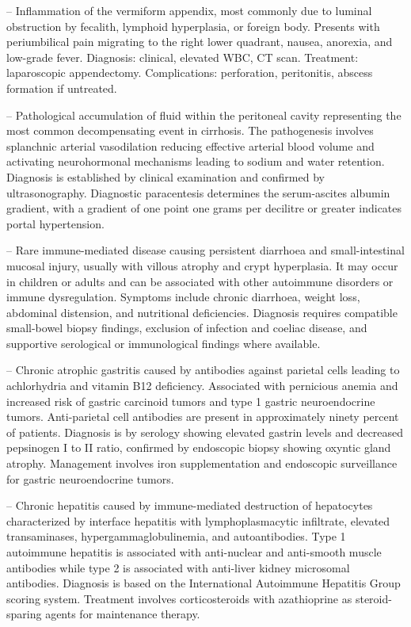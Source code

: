 -- Inflammation of the vermiform appendix, most commonly due to luminal obstruction by fecalith, lymphoid hyperplasia, or foreign body. Presents with periumbilical pain migrating to the right lower quadrant, nausea, anorexia, and low-grade fever. Diagnosis: clinical, elevated WBC, CT scan. Treatment: laparoscopic appendectomy. Complications: perforation, peritonitis, abscess formation if untreated.

-- Pathological accumulation of fluid within the peritoneal cavity representing the most common decompensating event in cirrhosis. The pathogenesis involves splanchnic arterial vasodilation reducing effective arterial blood volume and activating neurohormonal mechanisms leading to sodium and water retention. Diagnosis is established by clinical examination and confirmed by ultrasonography. Diagnostic paracentesis determines the serum-ascites albumin gradient, with a gradient of one point one grams per decilitre or greater indicates portal hypertension.

-- Rare immune-mediated disease causing persistent diarrhoea and small-intestinal mucosal injury, usually with villous atrophy and crypt hyperplasia. It may occur in children or adults and can be associated with other autoimmune disorders or immune dysregulation. Symptoms include chronic diarrhoea, weight loss, abdominal distension, and nutritional deficiencies. Diagnosis requires compatible small-bowel biopsy findings, exclusion of infection and coeliac disease, and supportive serological or immunological findings where available.

-- Chronic atrophic gastritis caused by antibodies against parietal cells leading to achlorhydria and vitamin B12 deficiency. Associated with pernicious anemia and increased risk of gastric carcinoid tumors and type 1 gastric neuroendocrine tumors. Anti-parietal cell antibodies are present in approximately ninety percent of patients. Diagnosis is by serology showing elevated gastrin levels and decreased pepsinogen I to II ratio, confirmed by endoscopic biopsy showing oxyntic gland atrophy. Management involves iron supplementation and endoscopic surveillance for gastric neuroendocrine tumors.

-- Chronic hepatitis caused by immune-mediated destruction of hepatocytes characterized by interface hepatitis with lymphoplasmacytic infiltrate, elevated transaminases, hypergammaglobulinemia, and autoantibodies. Type 1 autoimmune hepatitis is associated with anti-nuclear and anti-smooth muscle antibodies while type 2 is associated with anti-liver kidney microsomal antibodies. Diagnosis is based on the International Autoimmune Hepatitis Group scoring system. Treatment involves corticosteroids with azathioprine as steroid-sparing agents for maintenance therapy.

